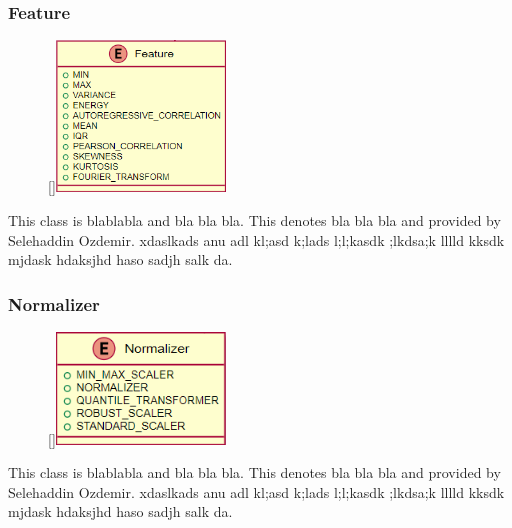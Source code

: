 \subsubsection{Feature}
\label{Feature}
\begin{figure}
    \raisebox{0pt}[\dimexpr{}\baselineskip\relax]{\includegraphics[width=4.5cm]{classes/model-management/6.png}}
\end{figure} 
\par
This class is blablabla and bla bla bla. This denotes bla bla bla and provided by Selehaddin Ozdemir. xdaslkads anu adl kl;asd k;lads l;l;kasdk ;lkdsa;k lllld kksdk mjdask hdaksjhd haso sadjh salk da.
\newline
\newline
\newline
\newline

\subsubsection{Normalizer}
\label{Normalizer}
\begin{figure}
    \raisebox{0pt}[\dimexpr{}\baselineskip\relax]{\includegraphics[width=4.5cm]{classes/model-management/7.png}}
\end{figure} 
\par
This class is blablabla and bla bla bla. This denotes bla bla bla and provided by Selehaddin Ozdemir. xdaslkads anu adl kl;asd k;lads l;l;kasdk ;lkdsa;k lllld kksdk mjdask hdaksjhd haso sadjh salk da.
\newline
\newline

